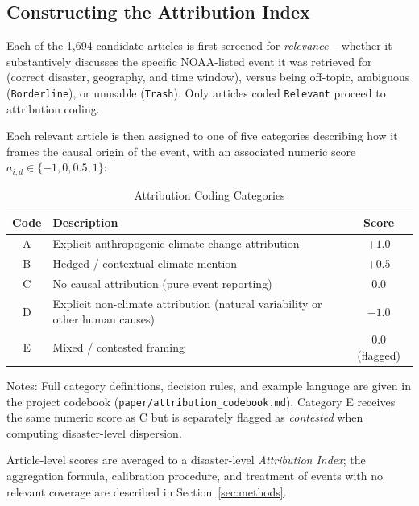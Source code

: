 \documentclass[12pt]{article}
\begin{document}
\subsection{Constructing the Attribution Index}
\label{sec:attribution_index_data}

Each of the 1,694 candidate articles is first screened for
\emph{relevance} -- whether it substantively discusses the specific
NOAA-listed event it was retrieved for (correct disaster, geography,
and time window), versus being off-topic, ambiguous (\texttt{Borderline}),
or unusable (\texttt{Trash}). Only articles coded \texttt{Relevant}
proceed to attribution coding.

Each relevant article is then assigned to one of five categories
describing how it frames the causal origin of the event, with an
associated numeric score $a_{i,d} \in \{-1, 0, 0.5, 1\}$:

\begin{table}[ht]
\centering
\caption{Attribution Coding Categories}
\label{tab:attribution_categories}
\begin{threeparttable}
\begin{tabular}{cp{10.5cm}c}
\toprule
Code & Description & Score \\
\midrule
A & Explicit anthropogenic climate-change attribution & $+1.0$ \\
B & Hedged / contextual climate mention & $+0.5$ \\
C & No causal attribution (pure event reporting) & $0.0$ \\
D & Explicit non-climate attribution (natural variability or other human causes) & $-1.0$ \\
E & Mixed / contested framing & $0.0$ (flagged) \\
\bottomrule
\end{tabular}
\begin{tablenotes}
\small
\item Notes: Full category definitions, decision rules, and example
language are given in the project codebook
(\texttt{paper/attribution\_codebook.md}). Category E receives the
same numeric score as C but is separately flagged as
\emph{contested} when computing disaster-level dispersion.
\end{tablenotes}
\end{threeparttable}
\end{table}

Article-level scores are averaged to a disaster-level
\emph{Attribution Index}; the aggregation formula, calibration
procedure, and treatment of events with no relevant coverage are
described in Section~\ref{sec:methods}.
\end{document}
